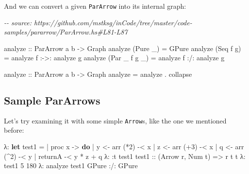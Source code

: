 \documentclass[]{article}
\newenvironment{Shaded}{}{}
\newcommand{\CommentTok}[1]{\textcolor[rgb]{0.38,0.63,0.69}{\textit{#1}}}
\newcommand{\DataTypeTok}[1]{\textcolor[rgb]{0.56,0.13,0.00}{#1}}
\newcommand{\DecValTok}[1]{\textcolor[rgb]{0.25,0.63,0.44}{#1}}
\newcommand{\KeywordTok}[1]{\textcolor[rgb]{0.00,0.44,0.13}{\textbf{#1}}}
\newcommand{\NormalTok}[1]{#1}
\newcommand{\OperatorTok}[1]{\textcolor[rgb]{0.40,0.40,0.40}{#1}}
\newcommand{\OtherTok}[1]{\textcolor[rgb]{0.00,0.44,0.13}{#1}}
\begin{document}
And we can convert a given \texttt{ParArrow} into its internal graph:

\begin{Shaded}
\begin{Highlighting}[]
\CommentTok{{-}{-} source: https://github.com/mstksg/inCode/tree/master/code{-}samples/pararrow/ParArrow.hs\#L81{-}L87}

\OtherTok{analyze\textquotesingle{} ::} \DataTypeTok{ParArrow}\NormalTok{ a b }\OtherTok{{-}>} \DataTypeTok{Graph}
\NormalTok{analyze\textquotesingle{} (}\DataTypeTok{Pure}\NormalTok{ \_) }\OtherTok{=} \DataTypeTok{GPure}
\NormalTok{analyze\textquotesingle{} (}\DataTypeTok{Seq}\NormalTok{ f g) }\OtherTok{=}\NormalTok{ analyze\textquotesingle{} f }\OperatorTok{:{-}>:}\NormalTok{ analyze\textquotesingle{} g}
\NormalTok{analyze\textquotesingle{} (}\DataTypeTok{Par}\NormalTok{ \_ f g \_) }\OtherTok{=}\NormalTok{ analyze\textquotesingle{} f }\OperatorTok{:/:}\NormalTok{ analyze\textquotesingle{} g}

\OtherTok{analyze ::} \DataTypeTok{ParArrow}\NormalTok{ a b }\OtherTok{{-}>} \DataTypeTok{Graph}
\NormalTok{analyze }\OtherTok{=}\NormalTok{ analyze\textquotesingle{} }\OperatorTok{.}\NormalTok{ collapse}
\end{Highlighting}
\end{Shaded}

\hypertarget{sample-pararrows}{%
\subsection{Sample ParArrows}\label{sample-pararrows}}

Let's try examining it with some simple \texttt{Arrow}s, like the one we
mentioned before:

\begin{Shaded}
\begin{Highlighting}[]
\NormalTok{λ}\OperatorTok{:} \KeywordTok{let}\NormalTok{ test1 }\OtherTok{=}
 \OperatorTok{|}\NormalTok{       proc x }\OtherTok{{-}>} \KeywordTok{do}
 \OperatorTok{|}\NormalTok{       y }\OtherTok{<{-}}\NormalTok{ arr (}\OperatorTok{*}\DecValTok{2}\NormalTok{) }\OperatorTok{{-}<}\NormalTok{ x}
 \OperatorTok{|}\NormalTok{       z }\OtherTok{<{-}}\NormalTok{ arr (}\OperatorTok{+}\DecValTok{3}\NormalTok{) }\OperatorTok{{-}<}\NormalTok{ x}
 \OperatorTok{|}\NormalTok{       q }\OtherTok{<{-}}\NormalTok{ arr (}\OperatorTok{\^{}}\DecValTok{2}\NormalTok{) }\OperatorTok{{-}<}\NormalTok{ y}
 \OperatorTok{|}\NormalTok{       returnA }\OperatorTok{{-}<}\NormalTok{ y }\OperatorTok{*}\NormalTok{ z }\OperatorTok{+}\NormalTok{ q}
\NormalTok{λ}\OperatorTok{:} \OperatorTok{:}\NormalTok{t test1}
\OtherTok{test1 ::}\NormalTok{ (}\DataTypeTok{Arrow}\NormalTok{ r, }\DataTypeTok{Num}\NormalTok{ t) }\OtherTok{=>}\NormalTok{ r t t}
\NormalTok{λ}\OperatorTok{:}\NormalTok{ test1 }\DecValTok{5}
\DecValTok{180}
\NormalTok{λ}\OperatorTok{:}\NormalTok{ analyze test1}
\DataTypeTok{GPure} \OperatorTok{:/:} \DataTypeTok{GPure}
\end{Highlighting}
\end{Shaded}
\end{document}
